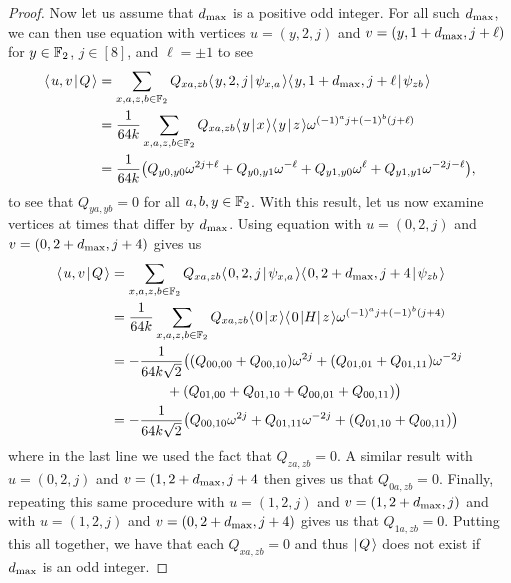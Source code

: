 \documentclass[../thesis-main/thesis-main]{subfiles}
\begin{document}
\begin{proof}
Now let us assume that $d_{\text{max}}$ is a positive odd integer.  For all such $d_{\text{max}}$, we can then use equation  with vertices $u =(y,2,j)$ and $v =(y,1+d_{\text{max}},j+\ell)$ for $y\in \mathbb{F}_2$, $j\in [8]$, and $\ell = \pm 1$ to see
\begin{align}
  \langle\mspace{2mu} u,v \mspace{2mu} | \mspace{2mu} Q\mspace{2mu} \rangle &= \sum_{x,a,z,b\in \mathbb{F}_2} Q_{xa,zb} \langle\mspace{2mu} y,2,j \mspace{2mu} | \mspace{2mu} \psi_{x,a}\mspace{2mu} \rangle\langle\mspace{2mu} y,1+d_{\text{max}},j+\ell \mspace{2mu} | \mspace{2mu} \psi_{zb}\mspace{2mu} \rangle\\
  &=\frac{1}{64 k} \sum_{x,a,z,b\in \mathbb{F}_2} Q_{xa,zb} \langle\mspace{2mu} y \mspace{2mu} | \mspace{2mu} x\mspace{2mu} \rangle \langle\mspace{2mu} y \mspace{2mu} | \mspace{2mu} z\mspace{2mu} \rangle \omega^{(-1)^a j+ (-1)^b (j+\ell)}\\
  &= \frac{1}{64 k} \big( Q_{y0,y0}  \omega^{2j + \ell} + Q_{y0,y1}\omega^{-\ell} + Q_{y1,y0} \omega^{\ell} + Q_{y1,y1}\omega^{-2j - \ell}\big),
\end{align}
to see that $Q_{ya,yb} = 0$ for all $a,b,y\in \mathbb{F}_2$.  With this result, let us now examine vertices at times that differ by $d_{\text{max}}$.  Using equation  with $u = (0,2,j)$ and $v = (0,2+d_{\text{max}},j+4)$ gives us
\begin{align}
  \langle\mspace{2mu} u,v \mspace{2mu} | \mspace{2mu} Q\mspace{2mu} \rangle &= \sum_{x,a,z,b\in \mathbb{F}_2} Q_{xa,zb} \langle\mspace{2mu} 0,2,j \mspace{2mu} | \mspace{2mu} \psi_{x,a}\mspace{2mu} \rangle\langle\mspace{2mu} 0,2+d_{\text{max}},j+4 \mspace{2mu} | \mspace{2mu} \psi_{zb}\mspace{2mu} \rangle\\
  &=\frac{1}{64 k} \sum_{x,a,z,b\in \mathbb{F}_2} Q_{xa,zb} \langle\mspace{2mu} 0 \mspace{2mu} | \mspace{2mu} x\mspace{2mu} \rangle \langle\mspace{2mu} 0 \mspace{2mu} |H|\mspace{2mu} z \mspace{2mu} \rangle \omega^{(-1)^a j+ (-1)^b (j+4)}\\
  &= -\frac{1}{64 k\sqrt{2}} \big((Q_{00,00}+ Q_{00,10} )  \omega^{2j} + (Q_{01,01} + Q_{01,11})\omega^{-2j}\nonumber\\
  &\qquad\qquad+(Q_{01,00} + Q_{01,10} + Q_{00,01} + Q_{00,11})\big)\\
  &= -\frac{1}{64 k \sqrt{2}} \big(Q_{00,10} \omega^{2j} + Q_{01,11} \omega^{-2j} + (Q_{01,10} + Q_{00,11})\big)
\end{align}
where in the last line we used the fact that $Q_{za,zb} = 0$.  A similar result with $u = (0,2,j)$ and $v = (1,2+d_{\text{max}}, j+4$ then gives us that $Q_{0a,zb} = 0$.  Finally, repeating this same procedure with $u = (1,2,j)$ and $v=(1,2+d_{\text{max}},j)$ and with $u = (1,2,j)$ and $v = (0,2+d_{\text{max}}, j+4)$ gives us that $Q_{1a,zb} = 0$.  Putting this all together, we have that each $Q_{xa,zb} = 0$ and thus $|\mspace{2mu} Q \mspace{2mu} \rangle$ does not exist if $d_{\text{max}}$ is an odd integer.


\end{proof}
\end{document}
